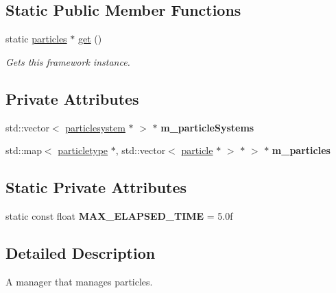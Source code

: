 \subsection*{Static Public Member Functions}
\begin{DoxyCompactItemize}
\item 
static \hyperlink{classflounder_1_1particles}{particles} $\ast$ \hyperlink{classflounder_1_1particles_aa1e98a0a6bf664a5ef5e8a637f5bc195}{get} ()
\begin{DoxyCompactList}\small\item\em Gets this framework instance. \end{DoxyCompactList}\end{DoxyCompactItemize}
\subsection*{Private Attributes}
\begin{DoxyCompactItemize}
\item 
\mbox{\label{classflounder_1_1particles_a13fce1ef2c28a33412d11d25914287cc}} 
std\+::vector$<$ \hyperlink{classflounder_1_1particlesystem}{particlesystem} $\ast$ $>$ $\ast$ {\bfseries m\+\_\+particle\+Systems}
\item 
\mbox{\label{classflounder_1_1particles_a91a156c7eb548c502a2a6d8c4d4441b3}} 
std\+::map$<$ \hyperlink{classflounder_1_1particletype}{particletype} $\ast$, std\+::vector$<$ \hyperlink{classflounder_1_1particle}{particle} $\ast$ $>$ $\ast$ $>$ $\ast$ {\bfseries m\+\_\+particles}
\end{DoxyCompactItemize}
\subsection*{Static Private Attributes}
\begin{DoxyCompactItemize}
\item 
\mbox{\label{classflounder_1_1particles_a0bd88dc91a7adc995a6afd2584098ac3}} 
static const float {\bfseries M\+A\+X\+\_\+\+E\+L\+A\+P\+S\+E\+D\+\_\+\+T\+I\+ME} = 5.\+0f
\end{DoxyCompactItemize}


\subsection{Detailed Description}
A manager that manages particles. 




